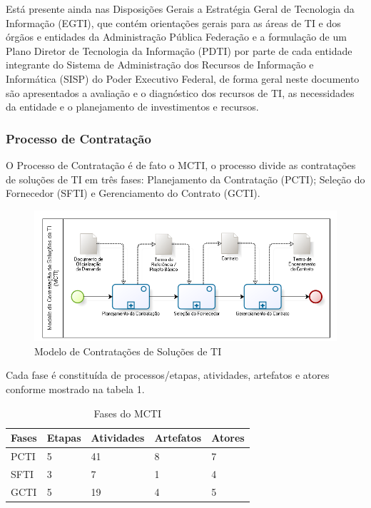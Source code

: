 Está presente ainda nas Disposições Gerais a Estratégia Geral de Tecnologia da Informação (EGTI), que contém orientações gerais para as áreas de TI e dos órgãos e entidades da Administração Pública Federação e a formulação de um Plano Diretor de Tecnologia da Informação (PDTI) por parte de cada entidade integrante do Sistema de Administração dos Recursos de Informação e Informática (SISP) do Poder Executivo Federal, de forma geral neste documento são apresentados a avaliação e o diagnóstico dos recursos de TI, as necessidades da entidade e o planejamento de investimentos e recursos.

\subsubsection[Processo de Contratação]{Processo de Contratação}

O Processo de Contratação é de fato o MCTI, o processo divide as contratações de soluções de TI em três fases: Planejamento da Contratação (PCTI); Seleção do Fornecedor (SFTI) e Gerenciamento do Contrato (GCTI).

\begin{figure}[h]
		\centering
		\label{fig05}
			\includegraphics[scale=0.8]{figuras/MCTI.png}
		\caption{Modelo de Contratações de Soluções de TI   \cite{mcti}}
\end{figure}


Cada fase é constituída de processos/etapas, atividades, artefatos e atores conforme mostrado na tabela 1.
  
\begin{table}[htb]
\center
\footnotesize
\begin{tabular}{|p{1.4cm}|p{1cm}|p{3cm}|p{3cm}|p{3cm}|}
  \hline
   \textbf{Fases} & \textbf{Etapas}  & \textbf{Atividades}  & \textbf{Artefatos} & \textbf{Atores}  \\
    \hline
    PCTI & 5 & 41 & 8 & 7\\
   \hline    
    SFTI & 3 & 7 & 1 & 4\\
    \hline
    GCTI & 5 & 19 & 4 & 5\\
   \hline
\end{tabular}
\caption{Fases do MCTI}
\end{table}

